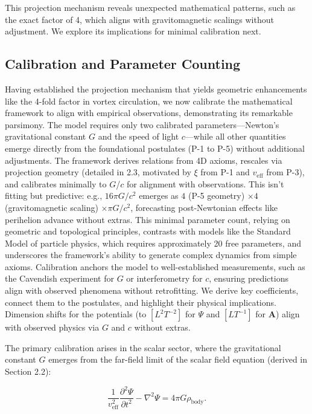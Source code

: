 This projection mechanism reveals unexpected mathematical patterns, such as the exact factor of 4, which aligns with gravitomagnetic scalings without adjustment. We explore its implications for minimal calibration next.

\subsection{Calibration and Parameter Counting}

Having established the projection mechanism that yields geometric enhancements like the 4-fold factor in vortex circulation, we now calibrate the mathematical framework to align with empirical observations, demonstrating its remarkable parsimony. The model requires only two calibrated parameters---Newton's gravitational constant $G$ and the speed of light $c$---while all other quantities emerge directly from the foundational postulates (P-1 to P-5) without additional adjustments. The framework derives relations from 4D axioms, rescales via projection geometry (detailed in 2.3, motivated by $\xi$ from P-1 and $v_{\text{eff}}$ from P-3), and calibrates minimally to $G$/$c$ for alignment with observations. This isn't fitting but predictive: e.g., $16\pi G/c^2$ emerges as $4$ (P-5 geometry) $\times 4$ (gravitomagnetic scaling) $\times \pi G/c^2$, forecasting post-Newtonian effects like perihelion advance without extras. This minimal parameter count, relying on geometric and topological principles, contrasts with models like the Standard Model of particle physics, which requires approximately 20 free parameters, and underscores the framework's ability to generate complex dynamics from simple axioms. Calibration anchors the model to well-established measurements, such as the Cavendish experiment for $G$ or interferometry for $c$, ensuring predictions align with observed phenomena without retrofitting. We derive key coefficients, connect them to the postulates, and highlight their physical implications. Dimension shifts for the potentials (to $[L^2 T^{-2}]$ for $\Psi$ and $[L T^{-1}]$ for $\mathbf{A}$) align with observed physics via $G$ and $c$ without extras.

The primary calibration arises in the scalar sector, where the gravitational constant $G$ emerges from the far-field limit of the scalar field equation (derived in Section 2.2):

\[
\frac{1}{v_{\text{eff}}^2} \frac{\partial^2 \Psi}{\partial t^2} - \nabla^2 \Psi = 4\pi G \rho_{\text{body}}.
\]

